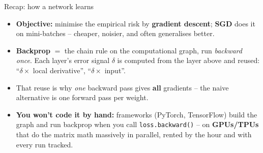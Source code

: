 \documentclass[aspectratio=43]{beamer}
\begin{document}
\begin{frame}{Recap: how a network learns}
  \begin{itemize}\small
    \item \textbf{Objective:} minimise the empirical risk by \textbf{gradient descent};
      \textbf{SGD} does it on mini-batches -- cheaper, noisier, and often generalises better.
    \item \textbf{Backprop} $=$ the chain rule on the computational graph, run \emph{backward
      once}. Each layer's error signal $\delta$ is computed from the layer above and reused:
      ``$\delta\times$ local derivative'', ``$\delta\times$ input''.
    \item That reuse is why \emph{one} backward pass gives \textbf{all} gradients -- the naive
      alternative is one forward pass per weight.
    \item \textbf{You won't code it by hand:} frameworks (PyTorch, TensorFlow) build the graph
      and run backprop when you call \texttt{loss.backward()} -- on \textbf{GPUs/TPUs} that do
      the matrix math massively in parallel, rented by the hour and with every run tracked.
  \end{itemize}
  \vfill
\end{frame}
\end{document}
